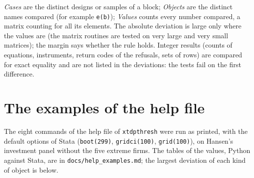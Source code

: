 \documentclass[10.5pt,a4paper]{article}
\newcommand{\code}[1]{\texttt{#1}}
\begin{document}
\noindent \emph{Cases} are the distinct designs or samples of a block; \emph{Objects} are the
distinct names compared (for example \code{e(b)}); \emph{Values} counts every number compared, a
matrix counting for all its elements. The absolute deviation is large only where the values
are (the matrix routines are tested on very large and very small matrices); the margin says
whether the rule holds. Integer results (counts of equations, instruments, return
codes of the refusals, sets of rows) are compared for exact equality and are not listed in the
deviations: the tests fail on the first difference.

\section{The examples of the help file}

The eight commands of the help file of \code{xtdpthresh} were run as printed, with the default options of Stata
(\code{boot(299)}, \code{gridci(100)}, \code{grid(100)}), on Hansen's investment panel without the five extreme firms.
The tables of the values, Python against Stata, are in \code{docs/help\_examples.md}; the largest deviation of each
kind of object is below.
\end{document}
